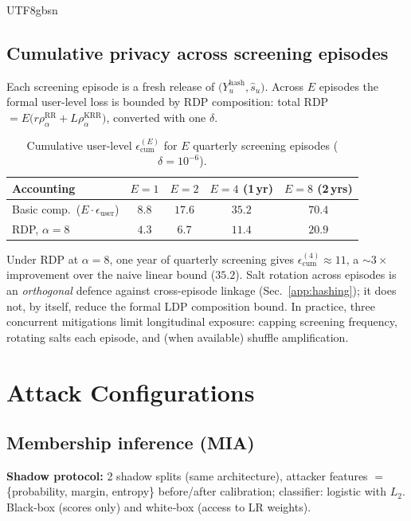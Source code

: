 \documentclass[acmsmall,natbib]{acmart}
\begin{document}
\begin{CJK*}{UTF8}{gbsn}
\subsection{Cumulative privacy across screening episodes}
\label{app:cum}
Each screening episode is a fresh release of $\bigl(Y^{\text{hash}}_u,\hat{s}_u\bigr)$. Across $E$ episodes the formal user-level loss is bounded by RDP composition: total RDP $=E\bigl(r\rho_\alpha^{\text{RR}}+L\rho_\alpha^{\text{KRR}}\bigr)$, converted with one $\delta$.

\begin{table}[h]
\centering
\caption{Cumulative user-level $\epsilon_{\text{cum}}^{(E)}$ for $E$ quarterly screening episodes ($\delta{=}10^{-6}$).}
\label{tab:cum-budget}
\setlength{\tabcolsep}{4.5pt}
\begin{tabular}{lcccc}
\toprule
\textbf{Accounting} & $E{=}1$ & $E{=}2$ & $E{=}4$ (1\,yr) & $E{=}8$ (2\,yrs) \\
\midrule
Basic comp.\ ($E\!\cdot\!\epsilon_{\text{user}}$) & $8.8$ & $17.6$ & $35.2$ & $70.4$ \\
RDP, $\alpha{=}8$ & $\mathbf{4.3}$ & $\mathbf{6.7}$ & $\mathbf{11.4}$ & $\mathbf{20.9}$ \\
\bottomrule
\end{tabular}
\end{table}

Under RDP at $\alpha{=}8$, one year of quarterly screening gives $\epsilon_{\text{cum}}^{(4)}{\approx}11$, a $\sim\!3{\times}$ improvement over the naive linear bound ($35.2$). Salt rotation across episodes is an \emph{orthogonal} defence against cross-episode linkage (Sec.~\ref{app:hashing}); it does not, by itself, reduce the formal LDP composition bound. In practice, three concurrent mitigations limit longitudinal exposure: capping screening frequency, rotating salts each episode, and (when available) shuffle amplification.


\section{Attack Configurations}
\label{app:attacks}

\subsection{Membership inference (MIA)}
\textbf{Shadow protocol:} 2 shadow splits (same architecture), attacker features $=$ \{probability, margin, entropy\} before/after calibration; classifier: logistic with $L_2$. Black‑box (scores only) and white‑box (access to LR weights).


\end{CJK*}
\end{document}
